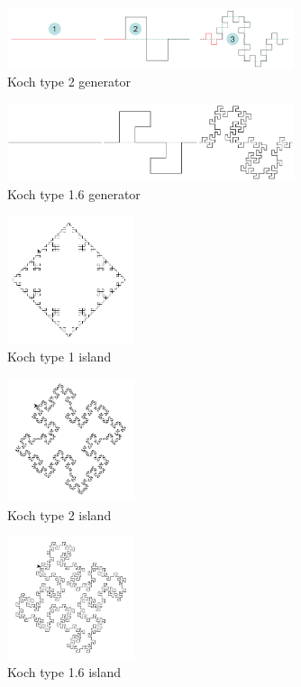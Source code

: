 \documentclass[12pt]{article}
\begin{document}
\begin{description}
\begin{itemize}
\begin{figure}[!htbp]
\centerline{\includegraphics[width=0.75\textwidth]{kochtype2}}
\caption{Koch type 2 generator}
\label{kochtype2}
\end{figure}

\begin{figure}[!htbp]
\centerline{\includegraphics[width=0.75\textwidth]{kochtype16} }
\caption{Koch type 1.6 generator}
\label{kochtype16}
\end{figure}

\begin{figure}[!htbp]
\centerline{\includegraphics[width=0.333\textwidth]{kochtype1island} }
\caption{Koch type 1 island}
\label{kochtype1island}
\end{figure}
\begin{figure}[!htbp]
\centerline{\includegraphics[width=0.333\textwidth]{kochtype2island} }
\caption{Koch type 2 island}
\label{kochtype2island}
\end{figure}
\begin{figure}[!htbp]
\centerline{\includegraphics[width=0.333\textwidth]{kochtype16island} }
\caption{Koch type 1.6 island}
\label{kochtype16island}
\end{figure}



\end{itemize}
\end{description}
\end{document}
